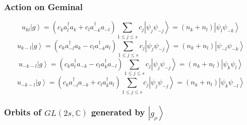 \documentclass[aps,preprint]{revtex4}%
\begin{document}
\subsubsection{Action on Geminal}%

\begin{equation}
u_{kl}\left\vert g\right\rangle =\left(  c_{k}a_{l}^{\dagger}a_{k}+c_{l}%
a_{-k}^{\dagger}a_{-l}\right)  \sum_{1\leq j\leq s}c_{j}\left\vert \psi
_{j}\psi_{-j}\right\rangle =\left(  n_{k}+n_{l}\right)  \left\vert \psi
_{l}\psi_{-k}\right\rangle
\end{equation}%
\begin{equation}
u_{k-l}\left\vert g\right\rangle =\left(  c_{k}a_{-l}^{\dagger}a_{k}%
-c_{l}a_{-k}^{\dagger}a_{l}\right)  \sum_{1\leq j\leq s}c_{j}\left\vert
\psi_{j}\psi_{-j}\right\rangle =\left(  n_{k}+n_{l}\right)  \left\vert
\psi_{-l}\psi_{-k}\right\rangle
\end{equation}%
\begin{equation}
u_{-k-l}\left\vert g\right\rangle =\left(  c_{k}a_{l}^{\dagger}a_{-k}%
-c_{l}a_{k}^{\dagger}a_{-l}\right)  \sum_{1\leq j\leq s}c_{j}\left\vert
\psi_{j}\psi_{-j}\right\rangle =\left(  n_{k}+n_{l}\right)  \left\vert
\psi_{k}\psi_{l}\right\rangle
\end{equation}%
\begin{equation}
u_{-k-l}\left\vert g\right\rangle =\left(  c_{k}a_{-l}^{\dagger}a_{-k}%
+c_{l}a_{k}^{\dagger}a_{l}\right)  \sum_{1\leq j\leq s}c_{j}\left\vert
\psi_{j}\psi_{-j}\right\rangle =\left(  n_{k}+n_{l}\right)  \left\vert
\psi_{k}\psi_{-l}\right\rangle
\end{equation}


\subsubsection{Orbits of $GL\left(  2s,\mathbb{C}\right)  $ generated by
$\left\vert g_{\rho}\right\rangle $}
\end{document}
